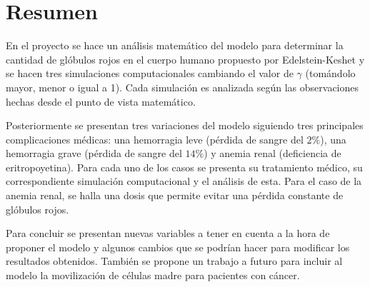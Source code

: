 \chapter*{Resumen}

En el proyecto se hace un análisis matemático del modelo para determinar la cantidad de glóbulos rojos en el cuerpo humano propuesto por Edelstein-Keshet y se hacen tres simulaciones computacionales cambiando el valor de $\gamma$ (tomándolo mayor, menor o igual a 1). Cada simulación es analizada según las observaciones hechas desde el punto de vista matemático. 

Posteriormente se presentan tres variaciones del modelo siguiendo tres principales complicaciones médicas: una hemorragia leve (pérdida de sangre del $2\%$), una hemorragia grave (pérdida de sangre del $14\%$) y anemia renal (deficiencia de eritropoyetina). Para cada uno de los casos se presenta su tratamiento médico, su correspondiente simulación computacional y el análisis de esta. Para el caso de la anemia renal, se halla una dosis que permite evitar una pérdida constante de glóbulos rojos. 

Para concluir se presentan nuevas variables a tener en cuenta a la hora de proponer el modelo y algunos cambios que se podrían hacer para modificar los resultados obtenidos. También se propone un trabajo a futuro para incluir al modelo la movilización de células madre para pacientes con cáncer.

